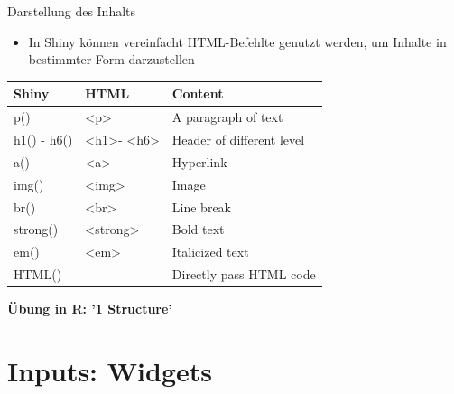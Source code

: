 \documentclass[xcolor=dvipsnames]{beamer}\usepackage[]{graphicx}\usepackage[]{color}
\begin{document}
\begin{frame}{Darstellung des Inhalts}        
  \begin{itemize}
    \item In Shiny können vereinfacht HTML-Befehlte genutzt werden, um Inhalte in bestimmter Form darzustellen
  \end{itemize}
  
  \begin{table}[]
  \begin{tabular}{lll}
  \hline \hline
  \textbf{Shiny} & \textbf{HTML}                                           & \textbf{Content}          \\ \hline
  p()            & \textless{}p\textgreater{}                              & A paragraph of text       \\
  h1() - h6()    & \textless{}h1\textgreater - \textless{}h6\textgreater{} & Header of different level \\
  a()            & \textless{}a\textgreater{}                              & Hyperlink                 \\
  img()          & \textless{}img\textgreater{}                            & Image                     \\
  br()           & \textless{}br\textgreater{}                             & Line break                \\
  strong()       & \textless{}strong\textgreater{}                         & Bold text                 \\
  em()           & \textless{}em\textgreater{}                             & Italicized text           \\
  HTML()         &                                                         & Directly pass HTML code   \\ \hline \hline
  \end{tabular}
  \end{table} 
\end{frame}


\begin{frame}{}
  \centering
  \textbf{Übung in R: '1 Structure'}
\end{frame}






\section{Inputs: Widgets} %
\end{document}
